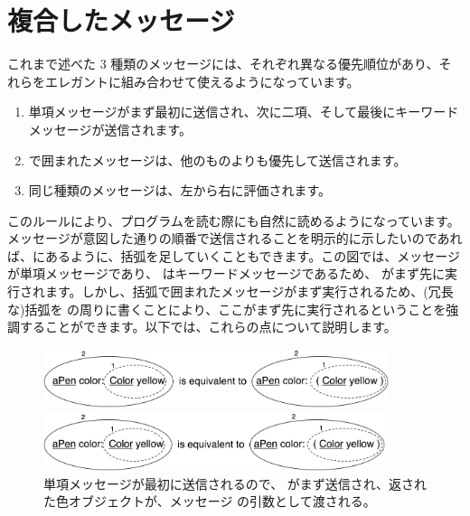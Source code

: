 \documentclass[a4paper,10pt,twoside]{book}
\begin{document}

\section{複合したメッセージ}
これまで述べた 3 種類のメッセージには、それぞれ異なる優先順位があり、それらをエレガントに組み合わせて使えるようになっています。

\begin{enumerate}
\item 単項メッセージがまず最初に送信され、次に二項、そして最後にキーワードメッセージが送信されます。
\item {}で囲まれたメッセージは、他のものよりも優先して送信されます。
\item 同じ種類のメッセージは、左から右に評価されます。
\end{enumerate}

このルールにより、プログラムを読む際にも自然に読めるようになっています。メッセージが意図した通りの順番で送信されることを明示的に示したいのであれば、にあるように、括弧を足していくこともできます。この図では、メッセージ  が単項メッセージであり、 はキーワードメッセージであるため、 がまず先に実行されます。しかし、括弧で囲まれたメッセージがまず実行されるため、(冗長な)括弧を  の周りに書くことにより、ここがまず先に実行されるということを強調することができます。以下では、これらの点について説明します。

\begin{figure}[ht]
\ifluluelse
	{\centerline{\includegraphics[width=0.9\textwidth]{uKeyUn}} }
	{\centerline{\includegraphics[width=10cm]{uKeyUn}} }
\caption{単項メッセージが最初に送信されるので、 がまず送信され、返された色オブジェクトが、メッセージ  の引数として渡される。}
\end{figure}
\end{document}
